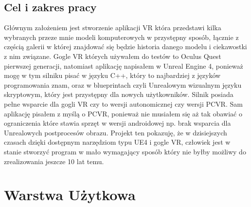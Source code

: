 \documentclass[a4paper,12pt,reqno]{article}
\begin{document}
\subsection{Cel i zakres pracy}

Głównym założeniem jest stworzenie aplikacji VR która przedstawi kilka wybranych
przeze mnie modeli komputerowych w przystępny sposób, łącznie z częścią galerii w
której znajdować się będzie historia danego modelu i ciekawostki z nim związane.
Gogle VR których używałem do testów to Oculus Quest pierwszej generacji,
natomiast aplikację napisałem w Unreal Engine 4, ponieważ mogę w tym silniku
pisać w języku C++, który to najbardziej z języków programowania znam, oraz w
blueprintach czyli Unrealowym wizualnym języku skryptowym, który jest przystępny
dla nowych użytkowników. Silnik posiada pełne wsparcie dla gogli VR czy to wersji
autonomicznej czy wersji PCVR. Sam aplikację pisałem z myślą o PCVR, ponieważ
nie musiałem się aż tak obawiać o ograniczenia które stawia sprzęt w wersji
androidowej np. brak wsparcia dla Unrealowych postprocesów obrazu. Projekt ten
pokazuję, że w dzisiejszych czasach dzięki dostępnym narzędziom typu UE4 i gogle
VR, człowiek jest w stanie stworzyć program w mało wymagający sposób który nie
byłby możliwy do zrealizowania jeszcze 10 lat temu.

\newpage
\section{Warstwa Użytkowa}
\end{document}
